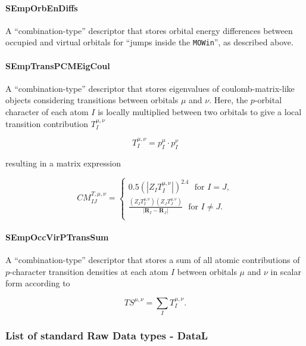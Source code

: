 \documentclass[12pt]{achemso}
\begin{document}
\paragraph{SEmpOrbEnDiffs}
A ``combination-type'' descriptor that stores orbital energy differences between occupied and virtual orbitals for ``jumps inside the \verb+MOWin+'', as described above.

\paragraph{SEmpTransPCMEigCoul}
A ``combination-type'' descriptor that stores eigenvalues of coulomb-matrix-like objects considering transitions between orbitals $\mu$ and $\nu$. Here, the $p$-orbital character of each atom $I$ is locally multiplied between two orbitals to give a local transition contribution $T_I^{\mu, \nu}$

\begin{equation}
    T_I^{\mu, \nu} = p_I^{\mu} \cdot p_I^{\nu}
\end{equation}

resulting in a matrix expression

\begin{equation}
    CM_{IJ}^{T,\mu,\nu} =\begin{cases}
    0.5 (|Z_I T_I^\mathrm{\mu, \nu}|)^{2.4} \,\,\,\, \mathrm{for}\,\, I = J,\\[0.5em]
    \frac{(Z_I T_I^\mathrm{\mu, \nu}) (Z_J T_J^\mathrm{\mu, \nu})}{|\mathbf{R}_I - \mathbf{R}_J|} \,\,\,\, \mathrm{for}\,\, I \neq J.\\
    \end{cases}
\end{equation}

\paragraph{SEmpOccVirPTransSum}
A ``combination-type'' descriptor that stores a sum of all atomic contributions of $p$-character transition densities at each atom $I$ between orbitals $\mu$ and $\nu$ in scalar form according to

\begin{equation}
    TS^{\mu, \nu} = \sum\limits_I T_I^{\mu, \nu}.
\end{equation}

\subsubsection{List of standard Raw Data types - DataL}
\end{document}
